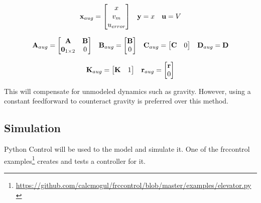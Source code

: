 \begin{equation*}
  \begin{array}{ccc}
    \mathbf{x}_{aug} =
    \begin{bmatrix}
      x \\
      v_m \\
      u_{error}
    \end{bmatrix} &
    \mathbf{y} = x &
    \mathbf{u} = V
  \end{array}
\end{equation*}

\begin{equation}
  \begin{array}{cccc}
    \mathbf{A}_{aug} =
    \begin{bmatrix}
      \mathbf{A} & \mathbf{B} \\
      \mathbf{0}_{1 \times 2} & 0
    \end{bmatrix} &
    \mathbf{B}_{aug} =
    \begin{bmatrix}
      \mathbf{B} \\
      0
    \end{bmatrix} &
    \mathbf{C}_{aug} = \begin{bmatrix}
      \mathbf{C} & 0
    \end{bmatrix} &
    \mathbf{D}_{aug} = \mathbf{D}
  \end{array}
\end{equation}

\begin{equation}
  \begin{array}{cc}
    \mathbf{K}_{aug} = \begin{bmatrix}
      \mathbf{K} & 1
    \end{bmatrix} &
    \mathbf{r}_{aug} = \begin{bmatrix}
      \mathbf{r} \\
      0
    \end{bmatrix}
  \end{array}
\end{equation}

This will compensate for unmodeled dynamics such as gravity. However, using a
constant feedforward to counteract gravity is preferred over this method.

\subsection{Simulation}

Python Control will be used to  the
\gls{model} and simulate it. One of the frccontrol
examples\footnote{\url{https://github.com/calcmogul/frccontrol/blob/master/examples/elevator.py}}
creates and tests a controller for it.

